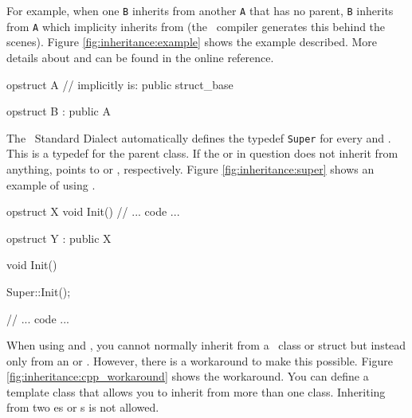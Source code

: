 For example, when one  {\tt B} inherits from another  {\tt A} that has no parent, {\tt B} inherits from {\tt A} which implicity inherits from  (the \opCPP\ compiler generates this behind the scenes).  Figure \ref{fig:inheritance:example} shows the example described.  More details about  and  can be found in the online reference. \\

\begin{opcpp}[label={fig:inheritance:example},caption={\opCPP\ inheritance example.}]
opstruct A // implicitly is: public struct_base
{

}

opstruct B : public A
{

}
\end{opcpp}

The \opCPP\ Standard Dialect automatically defines the typedef {\tt Super} for every  and .  This is a typedef for the parent class.  If the  or  in question does not inherit from anything,  points to  or , respectively.  Figure \ref{fig:inheritance:super} shows an example of using . \\

\begin{opcpp}[label={fig:inheritance:super},caption={Using the \opcppk{Super} typedef.}]
opstruct X
{
    void Init()
    {
        // ... code ...
    }
}

opstruct Y : public X
{
    void Init()
    {
        Super::Init();

        // ... code ...
    }
}
\end{opcpp}

When using  and , you cannot normally inherit from a \cpp\ class or struct but instead only from an  or .  However, there is a workaround to make this possible.  Figure \ref{fig:inheritance:cpp_workaround} shows the workaround.  You can define a template class that allows you to inherit from more than one class.  Inheriting from two es or s is not allowed.

